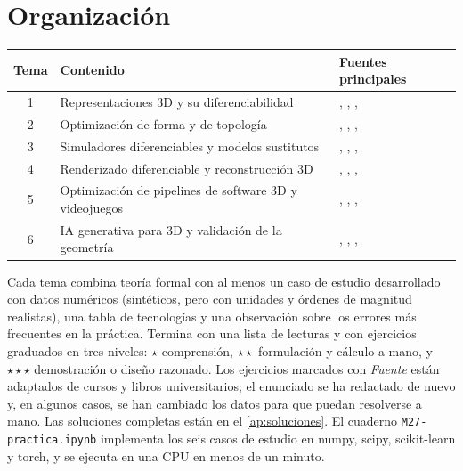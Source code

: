 \documentclass[11pt,a4paper,twoside,openany]{book}
\begin{document}
\section*{Organización}
\begin{center}\small
\begin{tabular}{@{}cp{7.4cm}p{4.6cm}@{}}
\toprule
Tema & Contenido & Fuentes principales \\
\midrule
1 & Representaciones 3D y su diferenciabilidad & \cite{cs348n}, \cite{deepsdf}, \cite{mc}, \cite{ingp} \\
2 & Optimización de forma y de topología & \cite{bs}, \cite{andreassen}, \cite{sigmund99}, \cite{mit18s096} \\
3 & Simuladores diferenciables y modelos sustitutos & \cite{kw}, \cite{johnson}, \cite{difftaichi}, \cite{fno} \\
4 & Renderizado diferenciable y reconstrucción 3D & \cite{softras}, \cite{nerf}, \cite{gs}, \cite{cmu16825} \\
5 & Optimización de pipelines de software 3D y videojuegos & \cite{garland}, \cite{nanite}, \cite{msbc}, \cite{ucsd190} \\
6 & IA generativa para 3D y validación de la geometría & \cite{dreamfusion}, \cite{meshgpt}, \cite{cmu16825}, \cite{langelaar} \\
\bottomrule
\end{tabular}
\end{center}

Cada tema combina teoría formal con al menos un caso de estudio desarrollado con datos numéricos (sintéticos, pero con unidades y órdenes de magnitud realistas), una tabla de tecnologías y una observación sobre los errores más frecuentes en la práctica. Termina con una lista de lecturas y con ejercicios graduados en tres niveles: $\star$ comprensión, $\star\star$ formulación y cálculo a mano, y $\star\star\star$ demostración o diseño razonado. Los ejercicios marcados con \emph{Fuente} están adaptados de cursos y libros universitarios; el enunciado se ha redactado de nuevo y, en algunos casos, se han cambiado los datos para que puedan resolverse a mano. Las soluciones completas están en el \cref{ap:soluciones}. El cuaderno \texttt{M27-practica.ipynb} implementa los seis casos de estudio en numpy, scipy, scikit-learn y torch, y se ejecuta en una CPU en menos de un minuto.
\end{document}
